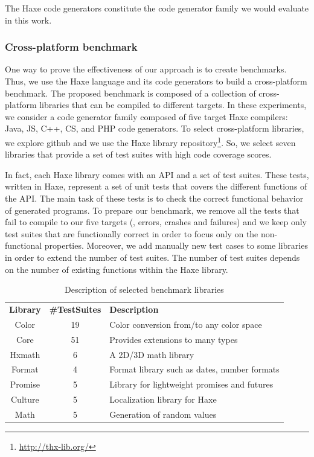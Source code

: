 The Haxe code generators constitute the code generator family we would evaluate in this work.

\subsubsection{Cross-platform benchmark}
One way to prove the effectiveness of our approach is to create benchmarks. Thus, we use the Haxe language and its code generators to build a cross-platform benchmark. The proposed benchmark is composed of a collection of cross-platform libraries that can be compiled to different targets. In these experiments, we consider a code generator family composed of five target Haxe compilers: Java, JS, C++, CS, and PHP code generators. To select cross-platform libraries, we explore github and we use the Haxe library repository\footnote{\url{http://thx-lib.org/}}. So, we select seven libraries that provide a set of test suites with high code coverage scores. 

In fact, each Haxe library comes with an API and a set of test suites. These tests, written in Haxe, represent a set of unit tests that covers the different functions of the API. The main task of these tests is to check the correct functional behavior of generated programs. To prepare our benchmark, we remove all the tests that fail to compile to our five targets (\ie, errors, crashes and failures) and we keep only test suites that are functionally correct in order to focus only on the non-functional properties.
Moreover, we add manually new test cases to some libraries in order to extend the number of test suites. The number of test suites depends on the number of existing functions within the Haxe library.


\begin{table}[h]
	\centering
	
	\begin{tabular}{|c|c|p{8.5cm}|}				
		\hline
		\textbf{Library} & \textbf{\#TestSuites} & \textbf{Description} \\
		\hhline{|=|=|=|}
		Color  &  19 &  Color conversion from/to any color space   \\ \hline
		Core & 51  & Provides extensions to many types  \\ \hline
		Hxmath & 6  & A 2D/3D math library  \\ \hline
		Format  &  4 & Format library such as dates, number formats   \\ \hline
		Promise & 5  & Library for lightweight promises and futures  \\ \hline
		Culture & 5  & Localization library for Haxe \\ \hline
		Math & 5  & Generation of random values \\ \hline
	\end{tabular}
	
	\caption{Description of selected benchmark libraries}
	\label{tab:Description of selected benchmark libraries}
\end{table}


